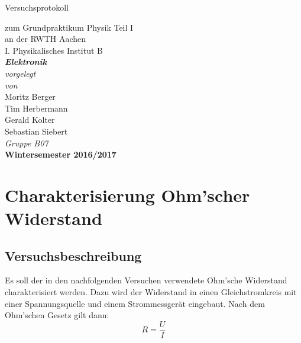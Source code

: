 \documentclass[12pt,a4paper]{article}
\author{Tim}
\begin{document}
\setlength{\parindent}{0pt} 
\begin{center}
{\LARGE Versuchsprotokoll}\\
\begin{large}
zum Grundpraktikum Physik Teil I\\[0.4cm]
an der RWTH Aachen\\
I. Physikalisches Institut B\\[4.5cm]
\Large\textbf{\textsl{Elektronik}}\\[4cm]
\normalsize\textit{vorgelegt\\von}\\[0.4cm]
\large{Moritz Berger\\Tim Herbermann\\Gerald Kolter\\Sebastian Siebert}\\[1cm]
\large \textit{Gruppe B07} \\ [3cm]
\large \textbf{Wintersemester 2016/2017}
\end{large}
\end{center}
\newpage

\tableofcontents
\newpage

\section{Charakterisierung Ohm'scher Widerstand}
\subsection{Versuchsbeschreibung}
Es soll der in den nachfolgenden Versuchen verwendete Ohm'sche Widerstand charakterisiert werden. Dazu wird der Widerstand in einen Gleichstromkreis mit einer Spannungsquelle und einem Strommessgerät eingebaut. Nach dem Ohm'schen Gesetz gilt dann:
\begin{equation}
R = \dfrac{U}{I}
\label{eq:Ohm}
\end{equation}
\end{document}
